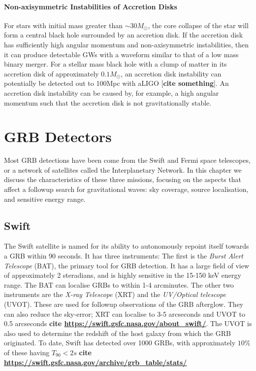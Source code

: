 \documentclass[11pt]{cuthesis}
\begin{document}
\paragraph{Non-axisymmetric Instabilities of Accretion Disks}
For stars with initial mass greater than $\sim 30M_\odot$, the core collapse of the star will form a central black hole surrounded by an accretion disk. If the accretion disk has sufficiently high angular momentum and non-axisymmetric instabilities, then it can produce detectable GWs with a waveform similar to that of a low mass binary merger. For a stellar mass black hole with a clump of matter in its accretion disk of approximately $0.1M_\odot$, an accretion disk instability can potentially be detected out to 100Mpc with aLIGO [\textbf{cite something}]. An accretion disk instability can be caused by, for example, a high angular momentum such that the accretion disk is not gravitationally stable. 

\section{GRB Detectors} \label{sec:grb detectors}
Most GRB detections have been come from the Swift and Fermi space telescopes, or a network of satellites called the Interplanetary Network. In this chapter we discuss the characteristics of these three missions, focusing on the aspects that affect a followup search for gravitational waves: sky coverage, source localisation, and sensitive energy range. 

\subsection{Swift}
The Swift satellite is named for its ability to autonomously repoint itself towards a GRB within 90 seconds. It has three instruments: The first is the \textit{Burst Alert Telescope} (BAT), the primary tool for GRB detection. It has a large field of view of approximately 2 steradians, and is highly sensitive in the 15-150 keV energy range. The BAT can localise GRBs to within 1-4 arcminutes. The other two instruments are the \textit{X-ray Telescope} (XRT) and the \textit{UV/Optical telescope} (UVOT). These are used for followup observations of the GRB afterglow. They can also reduce the sky-error; XRT can localise to 3-5 arcseconds and UVOT to 0.5 arcseconds \textbf{cite \url{https://swift.gsfc.nasa.gov/about_swift/}}. The UVOT is also used to determine the redshift of the host galaxy from which the GRB originated. To date, Swift has detected over 1000 GRBs, with approximately $10\%$ of these having $T_{90}<2s$ \textbf{cite \url{https://swift.gsfc.nasa.gov/archive/grb_table/stats/}}
\end{document}

